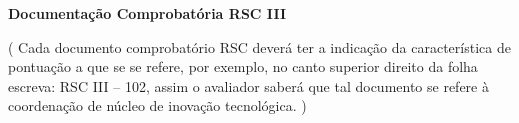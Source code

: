 \label{documentacao-probatoria-rsc-iii}

\begin{center}
	\begin{LARGE}
		\textbf{Documentação Comprobatória RSC III}
	\end{LARGE}
\end{center}

\begin{center}
	{\color{red}
		( Cada documento comprobatório RSC deverá ter a indicação da característica de pontuação a que se se refere, por exemplo, no canto superior direito da folha escreva: RSC III – 102, assim o avaliador saberá que tal documento se refere à coordenação de núcleo de inovação tecnológica. )
	}
\end{center}